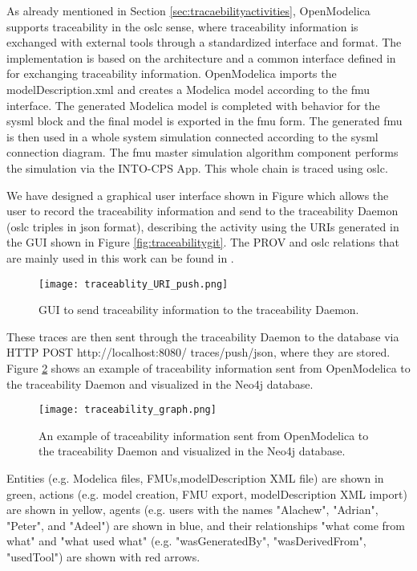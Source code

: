 As already mentioned in Section \ref{sec:tracaebilityactivities}, OpenModelica supports traceability in the \acrshort{oslc} sense, where
traceability information is exchanged with external tools through a standardized interface and format. 
The implementation is based on the architecture and a common interface defined in \cite{intocpskenneth} for 
exchanging traceability information. OpenModelica imports the modelDescription.xml and creates a Modelica model according to the \acrshort{fmu}
interface. The generated Modelica model is completed with behavior for the \acrshort{sysml} block and the final model
is exported in the \acrshort{fmu} form. The generated \acrshort{fmu} is then used in a whole system simulation connected
according to the \acrshort{sysml} connection diagram. The \acrshort{fmu} master simulation algorithm component performs
the simulation via the INTO-CPS App. This whole chain is traced using \acrshort{oslc}.

We have designed a graphical user interface shown in Figure which allows the user to record the
traceability information and send to the traceability Daemon (\acrshort{oslc} triples in \acrshort{json} format), describing the activity
using the URIs generated in the GUI shown in Figure  \ref{fig:traceabilitygit}. The PROV and \acrshort{oslc} relations that are mainly used
in this work can be found in \cite{intocpsjohn}.

\begin{figure}
	\texttt{[image: traceablity\_URI\_push.png]}
	\caption{GUI to send traceability information to the traceability Daemon.}
	\label{fig:traceabilitypush}
\end{figure}
  
These traces are then sent through the traceability Daemon to the database via HTTP POST http://localhost:8080/
traces/push/json, where they are stored. Figure \ref{fig:traceabilitygraph} shows an example of traceability information 
sent from OpenModelica to the traceability Daemon and visualized in the Neo4j database.
\begin{landscape}
\begin{figure}
	\texttt{[image: traceability\_graph.png]}
	\caption{An example of traceability information sent from OpenModelica to the traceability Daemon and visualized in the Neo4j database.}
	\label{fig:traceabilitygraph}
\end{figure}
\end{landscape}

Entities (e.g. Modelica files, FMUs,modelDescription XML file) are shown in green,
actions (e.g. model creation, FMU export, modelDescription XML import) are shown in yellow,
agents (e.g. users with the names {"Alachew"}, {"Adrian"}, {"Peter"}, and {"Adeel")} are shown in blue,
and their relationships "what come from what" and "what used what" (e.g. "wasGeneratedBy", "wasDerivedFrom", "usedTool") are 
shown with red arrows.

